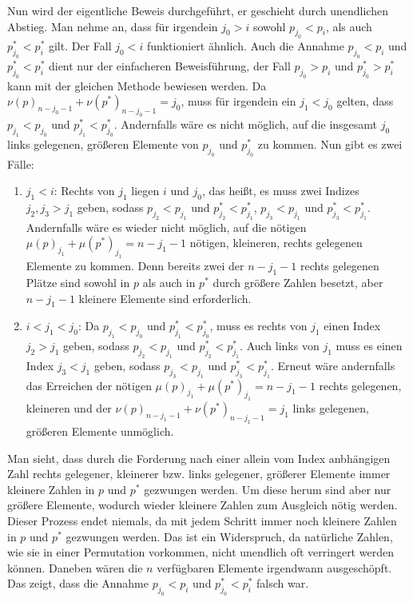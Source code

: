 \documentclass[a4paper, 11pt, ngerman]{article}
\begin{document}
Nun wird der eigentliche Beweis durchgeführt, er geschieht durch unendlichen Abstieg. Man nehme an, dass für irgendein $j_0 > i$ sowohl $p_{j_0} < p_i$, als auch $p^*_{j_0} < p^*_i$ gilt. Der Fall $j_0 < i$ funktioniert ähnlich. Auch die Annahme $p_{j_0} < p_i$ und $p^*_{j_0} < p^*_i$ dient nur der einfacheren Beweisführung, der Fall $p_{j_0} > p_i$ und $p^*_{j_0} > p^*_i$ kann mit der gleichen Methode bewiesen werden. Da $\nu(p)_{n - j_0 - 1} + \nu(p^*)_{n - j_0 - 1} = j_0$, muss für irgendein ein $j_1 < j_0$ gelten, dass $p_{j_1} < p_{j_0}$ und $p^*_{j_1} < p^*_{j_0}$. Andernfalls wäre es nicht möglich, auf die insgesamt $j_0$ links gelegenen, größeren Elemente von $p_{j_0}$ und $p^*_{j_0}$ zu kommen. Nun gibt es zwei Fälle:
\begin{enumerate}
    \item $j_1 < i$: Rechts von $j_1$ liegen $i$ und $j_0$, das heißt, es muss zwei Indizes $j_2, j_3 > j_1$ geben, sodass $p_{j_2} < p_{j_1}$ und $p^*_{j_2} < p^*_{j_1}$, $p_{j_3} < p_{j_1}$ und $p^*_{j_3} < p^*_{j_1}$. Andernfalls wäre es wieder nicht möglich, auf die nötigen $\mu(p)_{j_1} + \mu(p^*)_{j_1} = n - j_1 - 1$ nötigen, kleineren, rechts gelegenen Elemente zu kommen. Denn bereits zwei der $n - j_1 - 1$ rechts gelegenen Plätze sind sowohl in $p$ als auch in $p^*$ durch größere Zahlen besetzt, aber $n - j_1 - 1$ kleinere Elemente sind erforderlich.
    \item $i < j_1 < j_0$: Da $p_{j_1} < p_{j_0}$ und $p^*_{j_1} < p^*_{j_0}$, muss es rechts von $j_1$ einen Index $j_2 > j_1$ geben, sodass $p_{j_2} < p_{j_1}$ und $p^*_{j_2} < p^*_{j_1}$. Auch links von $j_1$ muss es einen Index $j_3 < j_1$ geben, sodass $p_{j_3} < p_{j_1}$ und $p^*_{j_3} < p^*_{j_1}$. Erneut wäre andernfalls das Erreichen der nötigen $\mu(p)_{j_1} + \mu(p^*)_{j_1} = n - j_1 - 1$ rechts gelegenen, kleineren und der $\nu(p)_{n - j_1 - 1} + \nu(p^*)_{n - j_1 - 1} = j_1$ links gelegenen, größeren Elemente unmöglich.
\end{enumerate}
Man sieht, dass durch die Forderung nach einer allein vom Index anbhängigen Zahl rechts gelegener, kleinerer bzw. links gelegener, größerer Elemente immer kleinere Zahlen in $p$ und $p^*$ gezwungen werden. Um diese herum sind aber nur größere Elemente, wodurch wieder kleinere Zahlen zum Ausgleich nötig werden. Dieser Prozess endet niemals, da mit jedem Schritt immer noch kleinere Zahlen in $p$ und $p^*$ gezwungen werden. Das ist ein Widerspruch, da natürliche Zahlen, wie sie in einer Permutation vorkommen, nicht unendlich oft verringert werden können. Daneben wären die $n$ verfügbaren Elemente irgendwann ausgeschöpft. Das zeigt, dass die Annahme $p_{j_0} < p_i$ und $p^*_{j_0} < p^*_i$ falsch war.
\end{document}
